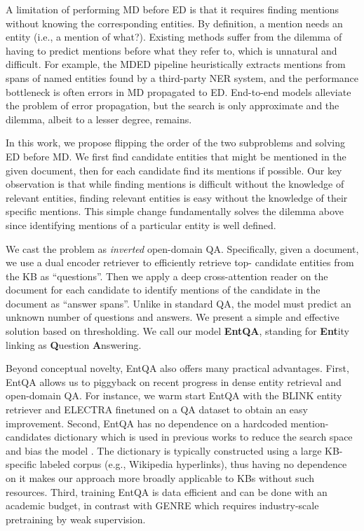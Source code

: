 \documentclass{article} \clearpage{}\usepackage{amsmath,amssymb,amsthm,bbm}
\theoremstyle{definition}
\begin{document}
A limitation of performing MD before ED is that it requires finding mentions without knowing the corresponding entities.
By definition, a mention needs an entity (i.e., a mention of what?).
Existing methods suffer from the dilemma of having to predict mentions before what they refer to, which is unnatural and difficult.
For example, the MDED pipeline heuristically extracts mentions from spans of named entities found by a third-party NER system,
and the performance bottleneck is often errors in MD propagated to ED.
End-to-end models alleviate the problem of error propagation, but the search is only approximate and the dilemma,
albeit to a lesser degree, remains.

In this work, we propose flipping the order of the two subproblems and solving ED before MD.
We first find candidate entities that might be mentioned in the given document, then for each candidate find its mentions if possible.
Our key observation is that while finding mentions is difficult without the knowledge of relevant entities,
finding relevant entities is easy without the knowledge of their specific mentions.
This simple change fundamentally solves the dilemma above since identifying mentions of a particular entity is well defined.

We cast the problem as \emph{inverted} open-domain QA.
Specifically, given a document, we use a dual encoder retriever to efficiently retrieve top- candidate entities from the KB as ``questions''.
Then we apply a deep cross-attention reader on the document for each candidate to identify mentions of the candidate in the document as ``answer spans''.
Unlike in standard QA, the model must predict an unknown number of questions and answers.
We present a simple and effective solution based on thresholding.
We call our model \textbf{EntQA}, standing for \textbf{Ent}ity linking as \textbf{Q}uestion \textbf{A}nswering.

Beyond conceptual novelty, EntQA also offers many practical advantages.
First, EntQA allows us to piggyback on recent progress in dense entity retrieval and open-domain QA.
For instance, we warm start EntQA with the BLINK entity retriever \citep{wu2020scalable} and ELECTRA finetuned on a QA dataset \citep{clark2019electra} to obtain an easy improvement.
Second, EntQA has no dependence on a hardcoded mention-candidates dictionary which is used in previous works to reduce the search space and bias the model
\citep{ganea2017deep,kolitsas2018end,cao2021autoregressive}.
The dictionary is typically constructed using a large KB-specific labeled corpus (e.g., Wikipedia hyperlinks),
thus having no dependence on it makes our approach more broadly applicable to KBs without such resources.
Third, training EntQA is data efficient and can be done with an academic budget,
in contrast with GENRE \citep{cao2021autoregressive} which requires industry-scale pretraining by weak supervision.
\end{document}
